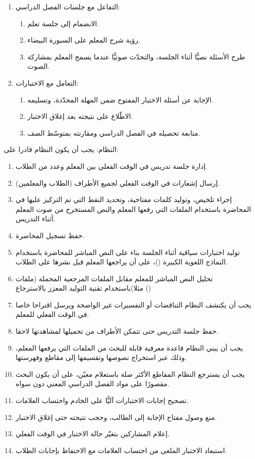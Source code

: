 \begin{enumerate}
  \item التفاعل مع جلسات الفصل الدراسي:
  \begin{enumerate}
    \item الانضمام إلى جلسة تعلم.
    \item رؤية شرح المعلم على السبورة البيضاء.
    \item طرح الأسئلة نصيًّا أثناء الجلسة، والتحدّث صوتيًّا عندما يسمح المعلم بمشاركة الصوت.
  \end{enumerate}
  \item التعامل مع الاختبارات:
  \begin{enumerate}
    \item الإجابة عن أسئلة الاختبار المفتوح ضمن المهلة المحدّدة، وتسليمه.
    \item الاطّلاع على نتيجته بعد إغلاق الاختبار.
    \item متابعة تحصيله في الفصل الدراسي ومقارنته بمتوسّط الصف.
  \end{enumerate}
\end{enumerate}

\noindent النظام: يجب أن يكون النظام قادرا على:

\begin{enumerate}
  \item إدارة جلسة تدريس في الوقت الفعلي بين المعلم وعدد من الطلاب.
  \item إرسال إشعارات في الوقت الفعلي لجميع الأطراف (الطلاب والمعلمين).
  \item إجراء تلخيص، وتوليد كلمات مفتاحية، وتحديد النقط التي تم التركيز عليها في المحاضرة باستخدام الملفات التي رفعها المعلم والنص المستخرج من صوت المعلم أثناء التدريس.
  \item حفظ تسجيل المحاضرة.
  \item توليد اختبارات سياقية أثناء الجلسة بناء على النص المباشر للمحاضرة باستخدام النماذج اللغوية الكبيرة ()، على أن يراجعها المعلم قبل نشرها على الطلاب.
  \item تحليل النص المباشر للمعلم مقابل الملفات المرجعية المحملة (ملفات  مثلا)باستخدام تقنية التوليد المعزز بالاسترجاع ()
  \item يجب أن يكتشف النظام التناقضات أو التفسيرات غير الواضحة ويرسل اقتراحا خاصا في الوقت الفعلي للمعلم.
  \item حفظ جلسة التدريس حتى تتمكن الأطراف من تحميلها لمشاهدتها لاحقا.
  \item يجب أن يبني النظام قاعدة معرفية قابلة للبحث من الملفات التي يرفعها المعلم، وذلك عبر استخراج نصوصها وتقسيمها إلى مقاطع وفهرستها.
  \item يجب أن يسترجع النظام المقاطع الأكثر صلة باستعلام معيّن، على أن يكون البحث مقصورًا على مواد الفصل الدراسي المعني دون سواه.
  \item تصحيح إجابات الاختبارات آليًّا على الخادم واحتساب العلامات.
  \item منع وصول مفتاح الإجابة إلى الطالب، وحجب نتيجته حتى إغلاق الاختبار.
  \item إعلام المشاركين بتغيّر حالة الاختبار في الوقت الفعلي.
  \item استبعاد الاختبار الملغى من احتساب العلامات مع الاحتفاظ بإجابات الطلاب.
\end{enumerate}

